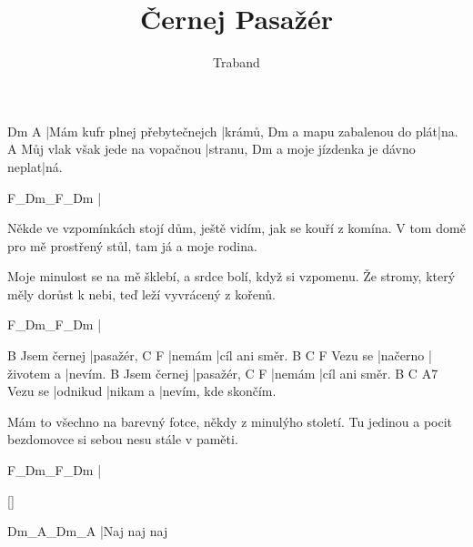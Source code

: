 \documentclass{song}
\title{Černej Pasažér}
\author{Traband}
\begin{document}
\strophe
Dm                            A
|Mám kufr plnej přebytečnejch |krámů,
                        Dm
a mapu zabalenou do plát|na.
                               A
Můj vlak však jede na vopačnou |stranu,
                               Dm
a moje jízdenka je dávno neplat|ná.
\endstrophe

\strophe
F_Dm_F_Dm
|
\endstrophe

\strophe*
Někde ve vzpomínkách stojí dům,
ještě vidím, jak se kouří z komína.
V tom domě pro mě prostřený stůl,
tam já a moje rodina.
\endstrophe

\strophe*
Moje minulost se na mě šklebí,
a srdce bolí, když si vzpomenu.
Že stromy, který měly dorůst k nebi,
teď leží vyvrácený z kořenů.
\endstrophe

\strophe
F_Dm_F_Dm
|
\endstrophe

            B
Jsem černej |pasažér,
C      F
|nemám |cíl ani směr.
        B        C          F
Vezu se |načerno |životem a |nevím.
            B
Jsem černej |pasažér,
C      F
|nemám |cíl ani směr.
        B        C        A7
Vezu se |odnikud |nikam a |nevím, kde skončím.
\endstrophe

\strophe*
Mám to všechno na barevný fotce,
někdy z minulýho století.
Tu jedinou a pocit bezdomovce
si sebou nesu stále v paměti.
\endstrophe

\strophe
F_Dm_F_Dm
|
\endstrophe

\ref{}

\strophe
Dm_A_Dm_A
|Naj naj naj
\endstrophe
\end{document}
